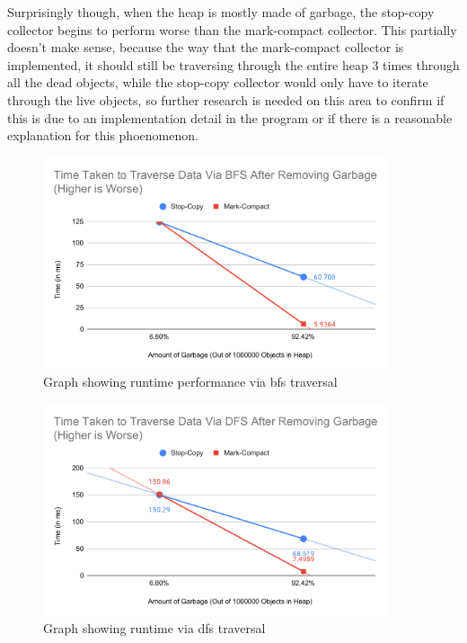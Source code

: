 \documentclass[index]{subfiles}
\begin{document}
Surprisingly though, when the heap is mostly made of garbage, the stop-copy collector begins to perform worse than the mark-compact collector. This partially doesn't make sense, because the way that the mark-compact collector is implemented, it should still be traversing through the entire heap 3 times through all the dead objects, while the stop-copy collector would only have to iterate through the live objects, so further research is needed on this area to confirm if this is due to an implementation detail in the program or if there is a reasonable explanation for this phoenomenon.

\begin{figure}[H]
    \centering
    \includegraphics[width=0.9\textwidth]{pics/traverse-bfs-perf.pdf}
    \caption{Graph showing runtime performance via bfs traversal}
\end{figure}

\begin{figure}[H]
    \centering
    \includegraphics[width=0.9\textwidth]{pics/traverse-dfs-perf.pdf}
    \caption{Graph showing runtime via dfs traversal}
\end{figure}
\end{document}
